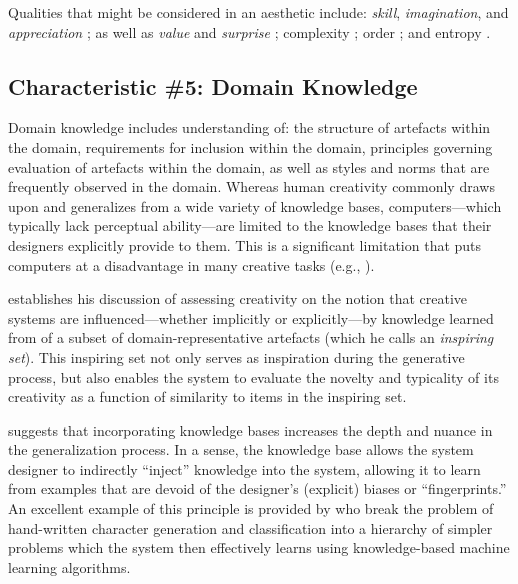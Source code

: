 \documentclass[phd,electronic,oneside,twosidetoc,letterpaper,chaptercenter,parttop,lof,lot]{byumsphd}
\begin{document}
Qualities that might be considered in an aesthetic include: \textit{skill}, \textit{imagination}, and \textit{appreciation} \citep{colton2008creativity}; as well as \textit{value} and \textit{surprise} \citep{Boden2003TheEdition}; complexity \citep{Hofstadter1980GodelBach}; order \citep{birkhoff1933aesthetic}; and entropy \citep{shannon2001mathematical}.

\subsection{Characteristic \#5: Domain Knowledge}

Domain knowledge includes understanding of: the structure of artefacts within the domain, requirements for inclusion within the domain, principles governing evaluation of artefacts within the domain, as well as styles and norms that are frequently observed in the domain. Whereas human creativity commonly draws upon and generalizes from a wide variety of knowledge bases, computers---which typically lack perceptual ability---are limited to the knowledge bases that their designers explicitly provide to them. This is a significant limitation that puts computers at a disadvantage in many creative tasks (e.g., \citep{bodily2018ComparativeAnalysis}).

\citeauthor{Ritchie2007} \cite{Ritchie2007} establishes his discussion of assessing creativity on the notion that creative systems are influenced---whether implicitly or explicitly---by knowledge learned from of a subset of domain-representative artefacts (which he calls an \textit{inspiring set}). This inspiring set not only serves as inspiration during the generative process, but also enables the system to evaluate the novelty and typicality of its creativity as a function of similarity to items in the inspiring set.

\citeauthor{Ventura2016} \cite{Ventura2016} suggests that incorporating knowledge bases increases the depth and nuance in the generalization process. In a sense, the knowledge base allows the system designer to indirectly ``inject'' knowledge into the system, allowing it to learn from examples that are devoid of the designer's (explicit) biases or ``fingerprints.'' An excellent example of this principle is provided by \citeauthor{Lake2015} \cite{Lake2015} who break the problem of hand-written character generation and classification into a hierarchy of simpler problems which the system then effectively learns using knowledge-based machine learning algorithms.
\end{document}
